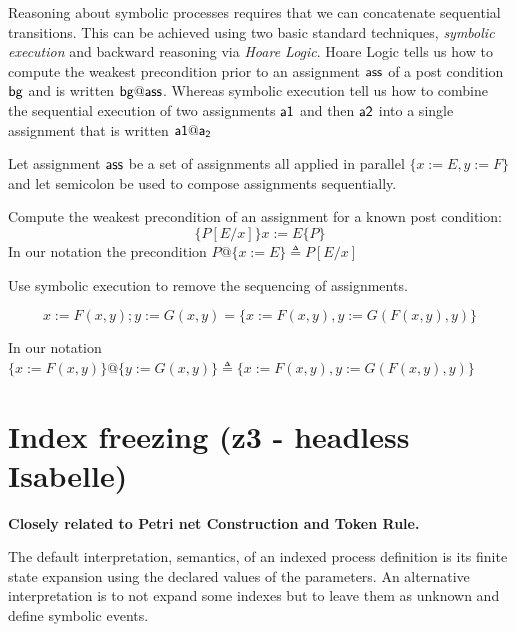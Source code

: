 \documentclass[]{article}
\begin{document}
Reasoning about symbolic processes requires that we can concatenate sequential transitions. This can be achieved using  two basic standard techniques, \emph{symbolic execution} and backward reasoning via \emph{Hoare Logic}. Hoare Logic tells us how to compute the weakest precondition prior to an assignment ${\sf ass}$ of  a post condition ${\sf bg}$ and is written  ${\sf bg@ass}$.  Whereas symbolic execution tell us how to combine the sequential execution of two assignments ${\sf a1}$ and then ${\sf a2}$ into a single assignment that is written ${\sf a1@a_2}$

Let assignment ${\sf ass}$ be a set of assignments all applied in parallel $\{x:=E,y:=F\}$ and let semicolon be used to compose assignments sequentially.

Compute the weakest precondition of an assignment for a known post condition:
\[ \{P[E/x]\} x:=E \{P\} \]
In our notation the precondition  $P@\{x:=E\}\triangleq P[E/x]$

Use symbolic execution to remove the sequencing of assignments.

\[ x:=F(x,y); y:=G(x,y)  = \{x:=F(x,y), y:=G(F(x,y),y)\}\]

In our notation $  \{x:=F(x,y)\}@\{y:=G(x,y)\}  \triangleq  \{x:=F(x,y), y:=G(F(x,y),y)\}$


\section{ Index freezing   (z3  -  headless Isabelle)}

{\bf Closely related to Petri net Construction and Token Rule.}

The default interpretation, semantics, of an indexed process definition is its finite state expansion using the declared values of the parameters. An alternative interpretation is to not expand some indexes but to leave them as unknown and define symbolic events.
 
\end{document}
